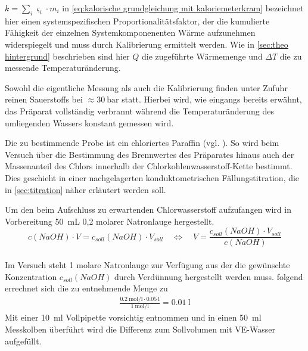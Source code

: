		\(k = \sum_i \varsigma_i \cdot m_i\) in \cref{eq:kalorische grundgleichung mit kaloriemeterkram} bezeichnet hier einen systemspezifischen Proportionalitätsfaktor, der die kumulierte
		Fähigkeit der einzelnen Systemkomponenenten Wärme aufzunehmen widerspiegelt und muss durch Kalibrierung ermittelt werden. Wie in \cref{sec:theo hintergrund} beschrieben sind hier \(Q\)
		die zugeführte Wärmemenge und \(\Delta T\) die zu messende Temperaturänderung.
		
		Sowohl die eigentliche Messung als auch die Kalibrierung finden unter Zufuhr reinen Sauerstoffs bei \(\approx \SI{30}{\bar}\) statt. Hierbei wird, wie eingangs bereits erwähnt, das Präparat
		vollständig verbrannt während die Temperaturänderung des umliegenden Wassers konstant gemessen wird.\par\medskip
		
		Die zu bestimmende Probe ist ein chloriertes Paraffin (vgl. ). So wird beim Versuch über die Bestimmung des Brennwertes des
		Präparates hinaus auch der Massenanteil des Chlors innerhalb der Chlorkohlenwasserstoff-Kette bestimmt. Dies geschieht in einer nachgelagerten konduktometrischen Fällungstitration, die in \cref{sec:titration}
		näher erläutert werden soll.\par\medskip
		Um den beim Aufschluss zu erwartenden Chlorwasserstoff aufzufangen wird in Vorbereitung \SI{50}{mL} 0,2 molarer Natronlauge hergestellt.
		\begin{equation}
			c(NaOH) \cdot V = c_{soll}(NaOH) \cdot V_{soll} \quad \Leftrightarrow \quad V = \frac{c_{soll}(NaOH) \cdot V_{soll}}{c(NaOH)}
			\label{eq:verduennung}
		\end{equation}\\
		Im Versuch steht 1 molare Natronlauge zur Verfügung aus der die gewünschte Konzentration \(c_{soll}(NaOH)\) durch Verdünnung hergestellt werden muss.
		 folgend errechnet sich die zu entnehmende Menge zu
		\begin{align}
			\frac{\SI{0,2}{\mole\per\litre} \cdot \SI{0,05}{\litre}}{\SI{1}{\mole\per\litre}} = \SI{0,01}{\litre}
		\end{align}
		Mit einer \SI{10}{\milli\litre} Vollpipette vorsichtig entnommen und in einen \SI{50}{\milli\litre} Messkolben überführt wird die Differenz zum Sollvolumen mit VE-Wasser aufgefüllt.\par\medskip
